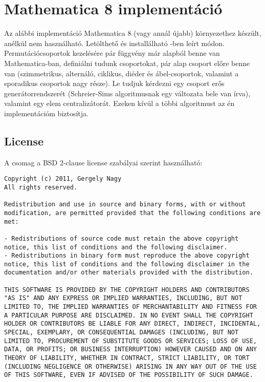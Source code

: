 \section{Mathematica 8 implementáció}
Az alábbi implementáció Mathematica 8 (vagy annál újabb) környezethez készült, anélkül nem használható.
Letölthető és installálható \cite{Nag11}-ben leírt módon.
Permutációcsoportok kezelésére pár függvény már alapból benne van Mathematica-ban,
definiálni tudunk csoportokat, pár alap csoport előre benne van
(szimmetrikus, alternáló, ciklikus, diéder és ábel-csoportok, valamint a sporadikus csoportok nagy része).
Le tudjuk kérdezni egy csoport erős generátorrendszerét (Schreier-Sims algoritmusnak egy változata bele van írva),
valamint egy elem centralizátorát.
Ezeken kívül a többi algoritmust az én implementációm biztosítja.
\clearpage

\subsection{License}
A csomag a BSD 2-clause license szabályai szerint használható:
\lstset{
	breaklines=true,
	showstringspaces=false,
}
\begin{lstlisting}
Copyright (c) 2011, Gergely Nagy
All rights reserved.

Redistribution and use in source and binary forms, with or without modification, are permitted provided that the following conditions are met:

- Redistributions of source code must retain the above copyright notice, this list of conditions and the following disclaimer.
- Redistributions in binary form must reproduce the above copyright notice, this list of conditions and the following disclaimer in the documentation and/or other materials provided with the distribution.

THIS SOFTWARE IS PROVIDED BY THE COPYRIGHT HOLDERS AND CONTRIBUTORS "AS IS" AND ANY EXPRESS OR IMPLIED WARRANTIES, INCLUDING, BUT NOT LIMITED TO, THE IMPLIED WARRANTIES OF MERCHANTABILITY AND FITNESS FOR A PARTICULAR PURPOSE ARE DISCLAIMED. IN NO EVENT SHALL THE COPYRIGHT HOLDER OR CONTRIBUTORS BE LIABLE FOR ANY DIRECT, INDIRECT, INCIDENTAL, SPECIAL, EXEMPLARY, OR CONSEQUENTIAL DAMAGES (INCLUDING, BUT NOT LIMITED TO, PROCUREMENT OF SUBSTITUTE GOODS OR SERVICES; LOSS OF USE, DATA, OR PROFITS; OR BUSINESS INTERRUPTION) HOWEVER CAUSED AND ON ANY THEORY OF LIABILITY, WHETHER IN CONTRACT, STRICT LIABILITY, OR TORT (INCLUDING NEGLIGENCE OR OTHERWISE) ARISING IN ANY WAY OUT OF THE USE OF THIS SOFTWARE, EVEN IF ADVISED OF THE POSSIBILITY OF SUCH DAMAGE.
\end{lstlisting}
\clearpage

